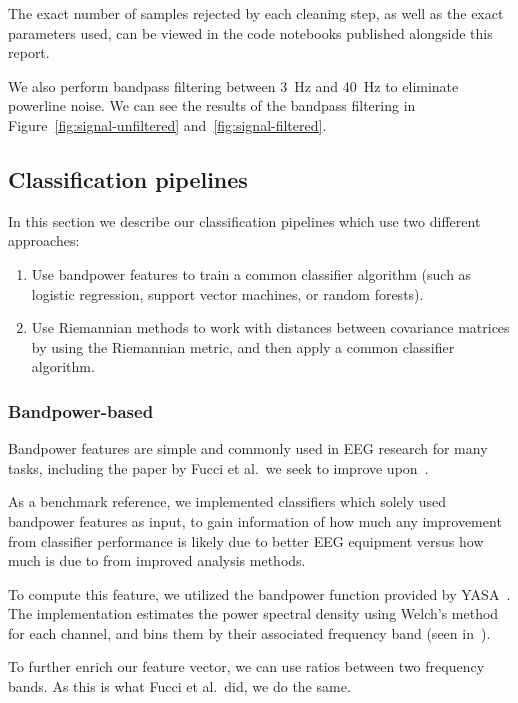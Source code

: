         The exact number of samples rejected by each cleaning step, as well as the exact parameters used, can be viewed in the code notebooks published alongside this report.

        We also perform bandpass filtering between \SI{3}{\hertz} and \SI{40}{\hertz} to eliminate powerline noise. We can see the results of the bandpass filtering in Figure~\ref{fig:signal-unfiltered} and~\ref{fig:signal-filtered}.

    \subsection{Classification pipelines}

        In this section we describe our classification pipelines which use two different approaches:

        \begin{enumerate}
            \item Use bandpower features to train a common classifier algorithm (such as logistic regression, support vector machines, or random forests).
            \item Use Riemannian methods to work with distances between covariance matrices by using the Riemannian metric, and then apply a common classifier algorithm.
        \end{enumerate}

        \subsubsection{Bandpower-based}

            Bandpower features are simple and commonly used in EEG research for many tasks, including the paper by Fucci et al.\ we seek to improve upon~\cite{fucci_replication_2019}. 

            As a benchmark reference, we implemented classifiers which solely used bandpower features as input, to gain information of how much any improvement from classifier performance is likely due to better EEG equipment versus how much is due to from improved analysis methods.

            To compute this feature, we utilized the bandpower function provided by YASA~\cite{vallat_yasa_2020}. The implementation estimates the power spectral density using Welch's method for each channel, and bins them by their associated frequency band (seen in~).

            To further enrich our feature vector, we can use ratios between two frequency bands. As this is what Fucci et al.\ did, we do the same.


